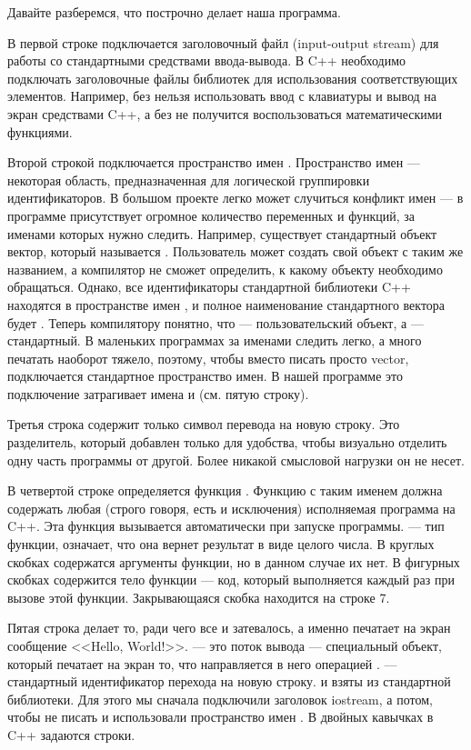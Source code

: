 \documentclass{article}
\begin{document}
Давайте разберемся, что построчно делает наша программа.

В первой строке подключается заголовочный файл  (input-output stream) для работы со стандартными средствами ввода-вывода. В C++ необходимо подключать заголовочные файлы библиотек для использования соответствующих элементов. Например, без  нельзя использовать ввод с клавиатуры и вывод на экран средствами C++, а без  не получится воспользоваться математическими функциями.

Второй строкой подключается пространство имен . Пространство имен --- некоторая область, предназначенная для логической группировки идентификаторов. В большом проекте легко может случиться конфликт имен --- в программе присутствует огромное количество переменных и функций, за именами которых нужно следить. Например, существует стандартный объект вектор, который называется . Пользователь может создать свой объект с таким же названием, а компилятор не сможет определить, к какому объекту необходимо обращаться. Однако, все идентификаторы стандартной библиотеки C++ находятся в пространстве имен , и полное наименование стандартного вектора будет . Теперь компилятору понятно, что  --- пользовательский объект, а  --- стандартный. В маленьких программах за именами следить легко, а много печатать наоборот тяжело, поэтому, чтобы вместо  писать просто vector, подключается стандартное пространство имен. В нашей программе это подключение затрагивает имена  и  (см. пятую строку).

Третья строка содержит только символ перевода на новую строку. Это разделитель, который добавлен только для удобства, чтобы визуально отделить одну часть программы от другой. Более никакой смысловой нагрузки он не несет.

В четвертой строке определяется функция . Функцию с таким именем должна содержать любая (строго говоря, есть и исключения) исполняемая программа на C++. Эта функция вызывается автоматически при запуске программы.  --- тип функции, означает, что она вернет результат в виде целого числа. В круглых скобках содержатся аргументы функции, но в данном случае их нет. В фигурных скобках содержится тело функции --- код, который выполняется каждый раз при вызове этой функции. Закрывающаяся скобка находится на строке 7.

Пятая строка делает то, ради чего все и затевалось, а именно печатает на экран сообщение <<Hello, World!>>.  --- это поток вывода --- специальный объект, который печатает на экран то, что направляется в него операцией \cppword{<{}<}.  --- стандартный идентификатор перехода на новую строку.  и  взяты из стандартной библиотеки. Для этого мы сначала подключили заголовок iostream, а потом, чтобы не писать  и  использовали пространство имен . В двойных кавычках в C++ задаются строки.
\end{document}
